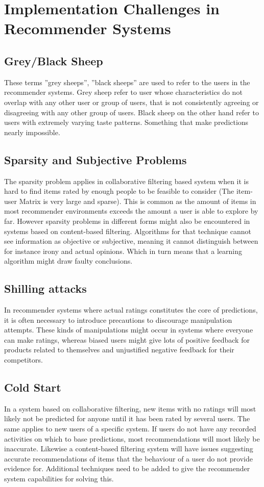\section{Implementation Challenges in Recommender Systems}

\subsection{Grey/Black Sheep}
These terms ”grey sheeps”, ”black sheeps” are used to refer to the users in the recommender systems. Grey sheep refer to user whose characteristics do not overlap with any other user or group of users, that is not consistently agreeing or disagreeing with any other group of users. Black sheep on the other hand refer to users with extremely varying taste patterns. Something that make predictions nearly impossible.

\subsection{Sparsity and Subjective Problems}
The sparsity problem applies in collaborative filtering based system when it is hard to find items rated by enough people to be feasible to consider (The item-user Matrix is very large and sparse). This is common as the amount of items in most recommender environments exceeds the amount a user is able to explore by far. However sparsity problems in different forms might also be encountered in systems based on content-based filtering. Algorithms for that technique cannot see information as objective or subjective, meaning it cannot distinguish between for instance irony and actual opinions. Which in turn means that a learning algorithm might draw faulty conclusions.


\subsection{Shilling attacks}
In recommender systems where actual ratings constitutes the core of predictions, it is often necessary to introduce precautions to discourage manipulation attempts. These kinds of manipulations might occur in systems where everyone can make ratings, whereas biased users might give lots of positive feedback for products related to themselves and unjustified negative feedback for their competitors.

\subsection{Cold Start}
In a system based on collaborative filtering, new items with no ratings will most likely not be predicted for anyone until it has been rated by several users. The same applies to new users of a specific system. If users do not have any recorded activities on which to base predictions, most recommendations will most likely be inaccurate. Likewise a content-based filtering system will have issues suggesting accurate recommendations of items that the behaviour of a user do not provide evidence for. Additional techniques need to be added to give the recommender system capabilities for solving this.

